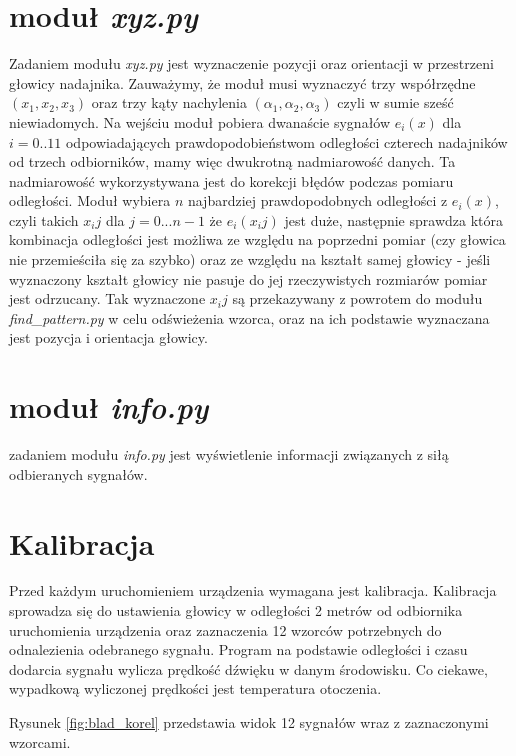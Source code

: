  
\section{moduł \textit{xyz.py}}

Zadaniem modułu \textit{xyz.py} jest wyznaczenie pozycji oraz orientacji w przestrzeni głowicy nadajnika.
Zauważymy, że moduł musi wyznaczyć trzy współrzędne $(x_1,x_2,x_3)$
oraz trzy kąty nachylenia $(\alpha_1, \alpha_2, \alpha_3)$ czyli w sumie sześć niewiadomych.
Na wejściu moduł pobiera dwanaście sygnałów $e_i(x)$ dla $i=0..11$ odpowiadających prawdopodobieństwom odległości
czterech nadajników od trzech odbiorników, mamy więc dwukrotną nadmiarowość danych.
Ta nadmiarowość wykorzystywana jest do korekcji błędów podczas pomiaru odległości.
Moduł wybiera $n$ najbardziej prawdopodobnych odległości z $e_i(x)$, czyli takich $x_ij$ dla $j = 0...n-1$
że $e_i(x_ij)$ jest duże, następnie sprawdza która kombinacja 
odległości jest możliwa ze względu na poprzedni pomiar (czy głowica nie przemieściła się za szybko)
oraz ze względu na kształt samej głowicy - jeśli wyznaczony kształt głowicy nie pasuje do jej rzeczywistych
rozmiarów pomiar jest odrzucany.
Tak wyznaczone $x_ij$ są przekazywany z powrotem do modułu \textit{find\_pattern.py} w celu odświeżenia wzorca,
oraz na ich podstawie wyznaczana jest pozycja i orientacja głowicy.

\section{moduł \textit{info.py}}

zadaniem modułu \textit{info.py} jest wyświetlenie informacji związanych z siłą odbieranych sygnałów.

\section{Kalibracja}

Przed każdym uruchomieniem urządzenia wymagana jest kalibracja.
Kalibracja sprowadza się do ustawienia głowicy w odległości 2 metrów od odbiornika
uruchomienia urządzenia oraz zaznaczenia 12 wzorców potrzebnych do odnalezienia 
odebranego sygnału.
Program na podstawie odległości i czasu dodarcia sygnału wylicza prędkość dźwięku 
w danym środowisku. Co ciekawe, wypadkową wyliczonej prędkości jest temperatura otoczenia.

Rysunek \ref{fig:blad_korel} przedstawia widok 12 sygnałów wraz z zaznaczonymi wzorcami.




